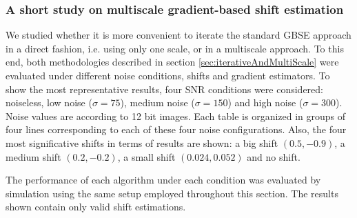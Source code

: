 \subsubsection{A short study on multiscale gradient-based shift estimation}
\label{sec:iterativeVsMultiscaleGBSE}
We studied whether it is more convenient to iterate the standard GBSE approach in a direct fashion, i.e. using only one scale, or in a multiscale approach. To this end, both methodologies described in section \ref{sec:iterativeAndMultiScale} were evaluated under different noise conditions, shifts and gradient estimators. To show the most representative results, four SNR conditions were considered: noiseless, low noise ($\sigma=75$), medium noise ($\sigma=150$) and high noise ($\sigma=300$). Noise values are according to 12 bit images. Each table is organized in groups of four lines corresponding to each of these four noise configurations. Also, the four most significative shifts in terms of results are shown: a big shift $(0.5, -0.9)$,  a medium shift $(0.2, -0.2)$, a small shift $(0.024, 0.052)$ and no shift. 

The performance of each algorithm under each condition was evaluated by simulation using the same setup employed throughout this section. 
The results shown contain only valid shift estimations.



